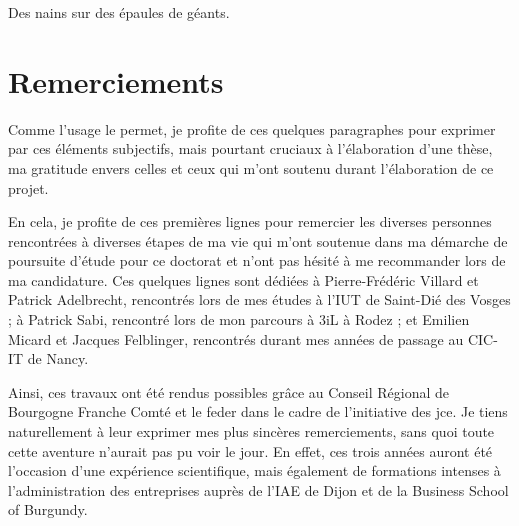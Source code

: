 \documentclass[english,standardlists]{spimubphdthesis}
\begin{document}
\dominitoc



\parbox[t]{\textwidth}
{
    \vspace{1.5cm}
	\begin{fquote}
		Des nains sur des épaules de géants.
	\end{fquote}	
}
	
\chapter*{Remerciements}
Comme l'usage le permet, je profite de ces quelques paragraphes pour exprimer par ces éléments subjectifs, mais pourtant cruciaux à l'élaboration d'une thèse, ma gratitude envers celles et ceux qui m'ont soutenu durant l'élaboration de ce projet.\par

En cela, je profite de ces premières lignes pour remercier les diverses personnes rencontrées à diverses étapes de ma vie qui m'ont soutenue dans ma démarche de poursuite d'étude pour ce doctorat et n'ont pas hésité à me recommander lors de ma candidature. Ces quelques lignes sont dédiées à Pierre-Frédéric Villard et Patrick Adelbrecht, rencontrés lors de mes études à l'IUT de Saint-Dié des Vosges ; à Patrick Sabi, rencontré lors de mon parcours à 3iL à Rodez ; et Emilien Micard et Jacques Felblinger, rencontrés durant mes années de passage au CIC-IT de Nancy.\par

Ainsi, ces travaux ont été rendus possibles grâce au Conseil Régional de Bourgogne Franche Comté et le \gls{feder} dans le cadre de l'initiative des \gls{jce}. Je tiens naturellement à leur exprimer mes plus sincères remerciements, sans quoi toute cette aventure n'aurait pas pu voir le jour. En effet, ces trois années auront été l'occasion d'une expérience scientifique, mais également de formations intenses à l'administration des entreprises auprès de l'IAE de Dijon et de la Business School of Burgundy.\par
\end{document}
